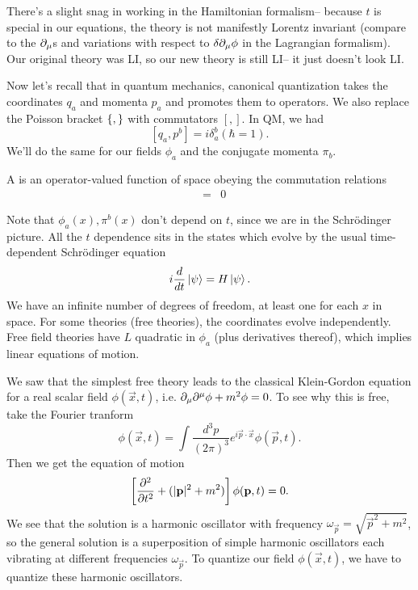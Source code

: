There's a slight snag in working in the Hamiltonian formalism-- because $t$ is special in our equations, the theory is not manifestly Lorentz invariant (compare to the $\p_\mu$s and variations with respect to $\delta \p_\mu \phi$ in the Lagrangian formalism). Our original theory was LI, so our new theory is still LI-- it just doesn't look LI.

Now let's recall that in quantum mechanics, canonical quantization takes the coordinates $q_a$ and momenta $p_a$ and promotes them to operators. We also replace the Poisson bracket $\set{,}$ with commutators $[,]$. In QM, we had
$$[q_a,p^b]= i \delta_a^b (\hbar=1).$$
We'll do the same for our fields $\phi_a$ and the conjugate momenta $\pi_b$.

\begin{defn}
A  is an operator-valued function of space obeying the commutation relations
\begin{eqnarray*}
[\phi_a(\vec{x}),\phi_b(\vec{y})]&=&0
\end{eqnarray*}
\end{defn}

Note that $\phi_a(x), \pi^b(x)$ don't depend on $t$, since we are in the Schr\"odinger picture. All the $t$ dependence sits in the states which evolve by the usual time-dependent Schr\"odinger equation
$$i\frac{d}{dt} \ket{\psi}=H\ket{\psi}.$$
We have an infinite number of degrees of freedom, at least one for each $x$ in space. For some theories (free theories), the coordinates evolve independently. Free field theories have $L$ quadratic in $\phi_a$ (plus derivatives thereof), which implies linear equations of motion.

We saw that the simplest free theory leads to the classical Klein-Gordon equation for a real scalar field $\phi(\vec{x},t)$, i.e. $\p_\mu \p^\mu \phi+m^2\phi=0$. To see why this is free, take the Fourier tranform
$$\phi(\vec{x},t)=\int \frac{d^3 p}{(2\pi)^3} e^{i \vec{p}\cdot \vec{x}}\phi (\vec{p},t).$$
Then we get the equation of motion
$$\left[\P[2]{}{t}+(|\vec{p}|^2+m^2)\right] \phi(\vec{p},t)=0.$$
We see that the solution is a harmonic oscillator with frequency $\omega_{\vec p} = \sqrt{\vec{p}^2 +m^2}$, so the general solution is a superposition of simple harmonic oscillators each vibrating at different frequencies $\omega_{\vec{p}}$. To quantize our field $\phi(\vec{x},t)$, we have to quantize these harmonic oscillators.

